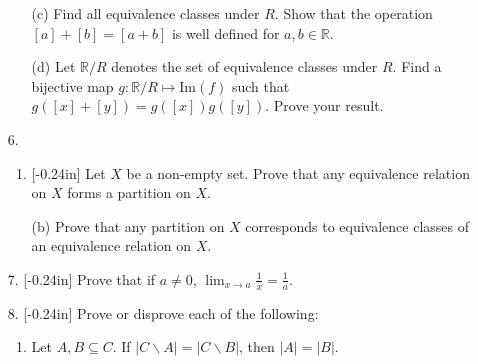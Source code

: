 \documentclass[letterpaper,12pt]{article}
\theoremstyle{definition}
\begin{document}
\pagebreak
\begin{enumerate}
    \item[] \begin{enumerate}
        \item[(c)] Find all equivalence classes under $R$. Show that the operation $[a] + [b] = [a+b]$ is well defined for $a,b \in \mathbb{R}$.
    \end{enumerate}
\end{enumerate}
\pagebreak
\begin{enumerate}
    \item[] \begin{enumerate}
        \item[(d)] Let $\mathbb{R}/R$ denotes the set of equivalence classes under $R$. Find a bijective map $g : \mathbb{R}/R \mapsto \mathrm{Im}(f)$ such that $g([x] + [y]) = g([x])g([y])$. Prove your result.
    \end{enumerate}
\end{enumerate}
\pagebreak
\begin{enumerate}
    \item[6.]  \begin{enumerate}
    \item \reversemarginpar{}[-0.24in] 
Let $X$ be a non-empty set. Prove that any equivalence relation on $X$ forms a partition on $X$.
\end{enumerate}
\end{enumerate}
\pagebreak
\begin{enumerate}
    \item[] \begin{enumerate}
        \item[(b)] Prove that any partition on $X$ corresponds to equivalence classes of an equivalence relation on $X$.
    \end{enumerate}
\end{enumerate}
\pagebreak
\begin{enumerate}
    \item[7.] 
     \reversemarginpar{}[-0.24in] Prove that if $a \neq 0$, $\lim_{x \rightarrow a} \frac{1}{x} = \frac{1}{a}$.
    \end{enumerate}
\pagebreak
\begin{enumerate}
    \item[8.] \reversemarginpar{}[-0.24in] Prove or disprove each of the following: \begin{enumerate}
        \item Let $A,B \subseteq C$. If $|C \backslash A| = |C \backslash B|$, then $|A| = |B|$.
    \end{enumerate}
\end{enumerate}
\end{document}
